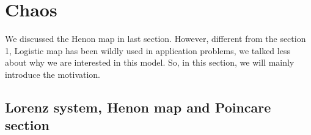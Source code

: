 \documentclass[12pt]{article}
\theoremstyle{plain}
\begin{document}















\newpage
\section{Chaos}

We discussed the Henon map in last section. However, different from the section 1, Logistic map has been wildly used in application problems, we talked less about why we are interested in this model. So, in this section, we will mainly introduce the motivation.




\subsection{Lorenz system, Henon map and Poincare section}
\end{document}
